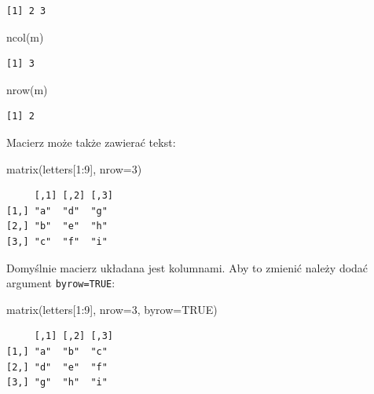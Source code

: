 \documentclass[
  letterpaper,
  DIV=11,
  numbers=noendperiod]{scrreprt}
\newenvironment{Shaded}{\begin{snugshade}}{\end{snugshade}}
\newcommand{\AttributeTok}[1]{\textcolor[rgb]{0.40,0.45,0.13}{#1}}
\newcommand{\ConstantTok}[1]{\textcolor[rgb]{0.56,0.35,0.01}{#1}}
\newcommand{\DecValTok}[1]{\textcolor[rgb]{0.68,0.00,0.00}{#1}}
\newcommand{\FunctionTok}[1]{\textcolor[rgb]{0.28,0.35,0.67}{#1}}
\newcommand{\NormalTok}[1]{\textcolor[rgb]{0.00,0.23,0.31}{#1}}
\newcommand{\SpecialCharTok}[1]{\textcolor[rgb]{0.37,0.37,0.37}{#1}}
\begin{document}
\begin{verbatim}
[1] 2 3
\end{verbatim}

\begin{Shaded}
\begin{Highlighting}[]
\FunctionTok{ncol}\NormalTok{(m)}
\end{Highlighting}
\end{Shaded}

\begin{verbatim}
[1] 3
\end{verbatim}

\begin{Shaded}
\begin{Highlighting}[]
\FunctionTok{nrow}\NormalTok{(m)}
\end{Highlighting}
\end{Shaded}

\begin{verbatim}
[1] 2
\end{verbatim}

Macierz może także zawierać tekst:

\begin{Shaded}
\begin{Highlighting}[]
\FunctionTok{matrix}\NormalTok{(letters[}\DecValTok{1}\SpecialCharTok{:}\DecValTok{9}\NormalTok{], }\AttributeTok{nrow=}\DecValTok{3}\NormalTok{)}
\end{Highlighting}
\end{Shaded}

\begin{verbatim}
     [,1] [,2] [,3]
[1,] "a"  "d"  "g" 
[2,] "b"  "e"  "h" 
[3,] "c"  "f"  "i" 
\end{verbatim}

Domyślnie macierz układana jest kolumnami. Aby to zmienić należy dodać
argument \texttt{byrow=TRUE}:

\begin{Shaded}
\begin{Highlighting}[]
\FunctionTok{matrix}\NormalTok{(letters[}\DecValTok{1}\SpecialCharTok{:}\DecValTok{9}\NormalTok{], }\AttributeTok{nrow=}\DecValTok{3}\NormalTok{, }\AttributeTok{byrow=}\ConstantTok{TRUE}\NormalTok{)}
\end{Highlighting}
\end{Shaded}

\begin{verbatim}
     [,1] [,2] [,3]
[1,] "a"  "b"  "c" 
[2,] "d"  "e"  "f" 
[3,] "g"  "h"  "i" 
\end{verbatim}
\end{document}
